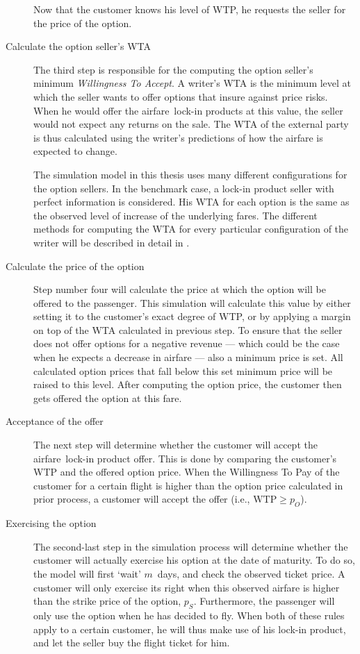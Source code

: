 \begin{description}
Now that the customer knows his level of WTP, he requests the seller for the price of the option.

\item[Calculate the option seller's WTA] The third step is responsible for the computing the option seller's minimum \emph{Willingness To Accept}. A writer's WTA is the minimum level at which the seller wants to offer options that insure against price risks. When he would offer the airfare~lock-in products at this value, the seller would not expect any returns on the sale. The WTA of the external party is thus calculated using the writer's predictions of how the airfare is expected to change.

The simulation model in this thesis uses many different configurations for the option sellers. In the benchmark case, a lock-in product seller with perfect information is considered. His WTA for each option is the same as the observed level of increase of the underlying fares. The different methods for computing the WTA for every particular configuration of the writer will be described in detail in .

\item[Calculate the price of the option] Step number four will calculate the price at which the option will be offered to the passenger. This simulation will calculate this value by either setting it to the customer's exact degree of WTP, or by applying a margin on top of the WTA calculated in previous step. To ensure that the seller does not offer options for a negative revenue --- which could be the case when he expects a decrease in airfare --- also a minimum price is set. All calculated option prices that fall below this set minimum price will be raised to this level. After computing the option price, the customer then gets offered the option at this fare.

\item[Acceptance of the offer] The next step will determine whether the customer will accept the airfare~lock-in product offer. This is done by comparing the customer's WTP and the offered option price. When the Willingness To Pay of the customer for a certain flight is higher than the option price calculated in prior process, a customer will accept the offer (i.e., $\text{WTP} \ge p_O$).

\item[Exercising the option] The second-last step in the simulation process will determine whether the customer will actually exercise his option at the date of maturity. To do so, the model will first `wait' $m$~days, and check the observed ticket price. A customer will only exercise its right when this observed airfare is higher than the strike price of the option, $p_S$. Furthermore, the passenger will only use the option when he has decided to fly. When both of these rules apply to a certain customer, he will thus make use of his lock-in product, and let the seller buy the flight ticket for him.


\end{description}
